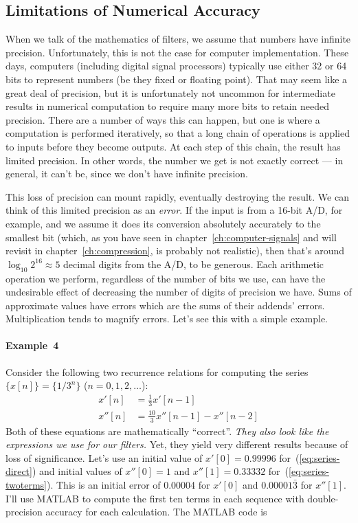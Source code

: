 \subsection{Limitations of Numerical Accuracy}

When we talk of the mathematics of filters, we assume that numbers
have infinite precision.  Unfortunately, this is not the case for
computer implementation.  These days, computers (including digital
signal processors) typically use either 32 or 64 bits to represent
numbers (be they fixed or floating point).  That may seem like a great
deal of precision, but it is unfortunately not uncommon for
intermediate results in numerical computation to require many more
bits to retain needed precision.  There are a number of ways this can
happen, but one is where a computation is performed iteratively, so
that a long chain of operations is applied to inputs before they
become outputs. At each step of this chain, the result has limited
precision. In other words, the number we get is not exactly correct
--- in general, it can't be, since we don't have infinite precision.

This loss of precision can mount rapidly, eventually destroying the
result. We can think of this limited precision as an \emph{error}. If
the input is from a 16-bit A/D, for example, and we assume it does its
conversion absolutely accurately to the smallest bit (which, as you
have seen in chapter~\ref{ch:computer-signals} and will revisit in
chapter~\ref{ch:compression}, is probably not realistic), then that's
around $\log_{10} 2^{16} \approx 5$ decimal digits from the A/D, to be
generous. Each arithmetic operation we perform, regardless of the
number of bits we use, can have the undesirable effect of decreasing
the number of digits of precision we have.  Sums of approximate values
have errors which are the sums of their addends' errors.
Multiplication tends to magnify errors. Let's see this with a simple
example.

\paragraph{Example~4}
Consider the following two recurrence relations for computing the
series $\{x[n]\} = \{1/3^n\}$ ($n = 0, 1, 2, \ldots$):
\begin{align}
x'[n]  &= \frac{1}{3} x'[n-1] \label{eq:series-direct} \\
x''[n] &= \frac{10}{3} x''[n-1] - x''[n-2]
\label{eq:series-twoterms}
\end{align}
Both of these equations are mathematically ``correct''. \emph{They
also look like the expressions we use for our filters.}  Yet, they
yield very different results because of loss of significance.  Let's
use an initial value of $x'[0] = 0.99996$ for~(\ref{eq:series-direct})
and initial values of $x''[0]=1$ and $x''[1]=0.33332$
for~(\ref{eq:series-twoterms}). This is an initial error of 0.00004
for $x'[0]$ and $0.00001\bar{3}$ for $x''[1]$. I'll use MATLAB to
compute the first ten terms in each sequence with double-precision
accuracy for each calculation.  The MATLAB code is

